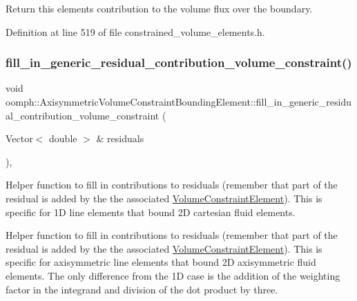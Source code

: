 Return this element\textquotesingle{}s contribution to the volume flux over the boundary. 



Definition at line 519 of file constrained\+\_\+volume\+\_\+elements.\+h.

\mbox{\label{classoomph_1_1AxisymmetricVolumeConstraintBoundingElement_a2a3f3b86079f27d52679f357f5276d91}} 
\subsubsection{\texorpdfstring{fill\+\_\+in\+\_\+generic\+\_\+residual\+\_\+contribution\+\_\+volume\+\_\+constraint()}{fill\_in\_generic\_residual\_contribution\_volume\_constraint()}}
{\footnotesize\ttfamily void oomph\+::\+Axisymmetric\+Volume\+Constraint\+Bounding\+Element\+::fill\+\_\+in\+\_\+generic\+\_\+residual\+\_\+contribution\+\_\+volume\+\_\+constraint (\begin{DoxyParamCaption}\item[{Vector$<$ double $>$ \&}]{residuals }\end{DoxyParamCaption})\hspace{0.3cm}{\ttfamily [protected]}, {\ttfamily [virtual]}}



Helper function to fill in contributions to residuals (remember that part of the residual is added by the the associated \hyperlink{classoomph_1_1VolumeConstraintElement}{Volume\+Constraint\+Element}). This is specific for 1D line elements that bound 2D cartesian fluid elements. 

Helper function to fill in contributions to residuals (remember that part of the residual is added by the the associated \hyperlink{classoomph_1_1VolumeConstraintElement}{Volume\+Constraint\+Element}). This is specific for axisymmetric line elements that bound 2D axisymmetric fluid elements. The only difference from the 1D case is the addition of the weighting factor in the integrand and division of the dot product by three. 

